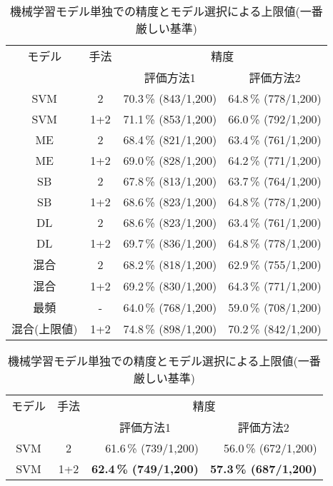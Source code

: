 \begin{table}[htbp]
  \begin{center}
    \caption{機械学習モデル単独での精度とモデル選択による上限値(一番緩い基準)}
    \label{tab:exp:each_model1}
    \begin{tabular}[c]{|c|c|r|r|}
      \hline
      モデル & 手法 & \multicolumn{2}{c|}{精度}\\
      \cline{2-4}
      & & \multicolumn{1}{c|}{評価方法1} & \multicolumn{1}{c|}{評価方法2} \\
      \hline
      SVM & 2   & 70.3\,\% (843/1,200) & 64.8\,\% (778/1,200)\\
      SVM & 1+2 & 71.1\,\% (853/1,200) & 66.0\,\% (792/1,200)\\
      ME  & 2   & 68.4\,\% (821/1,200) & 63.4\,\% (761/1,200)\\
      ME  & 1+2 & 69.0\,\% (828/1,200) & 64.2\,\% (771/1,200)\\
      SB  & 2   & 67.8\,\% (813/1,200) & 63.7\,\% (764/1,200)\\
      SB  & 1+2 & 68.6\,\% (823/1,200) & 64.8\,\% (778/1,200)\\
      DL  & 2   & 68.6\,\% (823/1,200) & 63.4\,\% (761/1,200)\\
      DL  & 1+2 & 69.7\,\% (836/1,200) & 64.8\,\% (778/1,200)\\
      混合 & 2   & 68.2\,\% (818/1,200) & 62.9\,\% (755/1,200) \\
      混合 & 1+2 & 69.2\,\% (830/1,200) & 64.3\,\% (771/1,200) \\
      最頻 & - & 64.0\,\% (768/1,200) & 59.0\,\% (708/1,200) \\
      \hline
      混合(上限値) & 1+2 & 74.8\,\% (898/1,200) & 70.2\,\% (842/1,200)\\
      \hline
    \end{tabular}
  \end{center}
  \begin{center}
    \caption{機械学習モデル単独での精度とモデル選択による上限値(一番厳しい基準)}
    \label{tab:exp:each_model2}
    \begin{tabular}[c]{|c|c|r|r|}
      \hline
      モデル & 手法 & \multicolumn{2}{c|}{精度}\\
      \cline{2-4}
      & & \multicolumn{1}{c|}{評価方法1} & \multicolumn{1}{c|}{評価方法2} \\
      \hline
      SVM & 2   & 61.6\,\% (739/1,200) & 56.0\,\% (672/1,200)\\
      SVM & 1+2 & {\bf 62.4\,\% (749/1,200)} & {\bf 57.3\,\% (687/1,200)}\\

\end{tabular}
\end{center}
\end{table}
